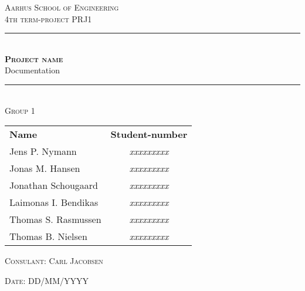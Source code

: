 \newcommand{\HRule}{\rule{\linewidth}{0.1mm}} %

\begin{center}
	
	\textsc{\LARGE Aarhus School of Engineering}\\[1.5cm] %
	
	\textsc{\large 4th term-project PRJ1}\\[2.5cm] 
	\HRule \\[0.8cm]
	{\huge \bfseries \textsc{Project name}} \\[0.5cm]{\LARGE Documentation} \\[0.4cm]
	\HRule \\[1.5cm]
	
	\textsc{\large Group 1}\\
	\vspace{0.5 in}
	\begin{center}
		\begin{tabular}{l c}
			\textbf{Name} & \textbf{Student-number} \\
			Jens P. Nymann & \textsl{xxxxxxxxx} \\
			Jonas M. Hansen & \textsl{xxxxxxxxx} \\
			Jonathan Schougaard & \textsl{xxxxxxxxx} \\
			Laimonas I. Bendikas & \textsl{xxxxxxxxx} \\
			Thomas S. Rasmussen & \textsl{xxxxxxxxx} \\
			Thomas B. Nielsen & \textsl{xxxxxxxxx} \\
		\end{tabular}
	\end{center}
	\vspace{0.5 in}
	
	\textsc{\large Consulant: Carl Jacobsen}
	\vspace{0.5 in}
	
	\textsc{\large Date: DD/MM/YYYY}\\
	
\end{center} %

\newpage